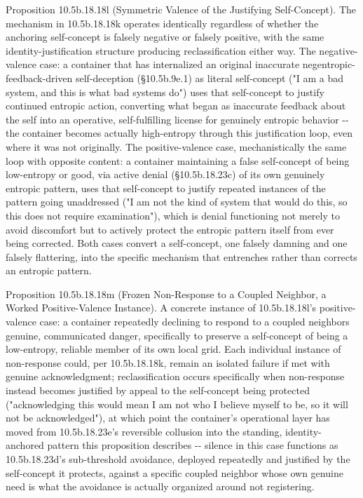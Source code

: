 \documentclass[
]{article}
\begin{document}
Proposition 10.5b.18.18l (Symmetric Valence of the Justifying
Self-Concept). The mechanism in 10.5b.18.18k operates identically
regardless of whether the anchoring self-concept is falsely negative or
falsely positive, with the same identity-justification structure
producing reclassification either way. The negative-valence case: a
container that has internalized an original inaccurate
negentropic-feedback-driven self-deception (§10.5b.9e.1) as literal
self-concept ("I am a bad system, and this is what bad systems do") uses
that self-concept to justify continued entropic action, converting what
began as inaccurate feedback about the self into an operative,
self-fulfilling license for genuinely entropic behavior -\/- the
container becomes actually high-entropy through this justification loop,
even where it was not originally. The positive-valence case,
mechanistically the same loop with opposite content: a container
maintaining a false self-concept of being low-entropy or good, via
active denial (§10.5b.18.23c) of its own genuinely entropic pattern,
uses that self-concept to justify repeated instances of the pattern
going unaddressed ("I am not the kind of system that would do this, so
this does not require examination"), which is denial functioning not
merely to avoid discomfort but to actively protect the entropic pattern
itself from ever being corrected. Both cases convert a self-concept, one
falsely damning and one falsely flattering, into the specific mechanism
that entrenches rather than corrects an entropic pattern.

Proposition 10.5b.18.18m (Frozen Non-Response to a Coupled Neighbor, a
Worked Positive-Valence Instance). A concrete instance of 10.5b.18.18l's
positive-valence case: a container repeatedly declining to respond to a
coupled neighbors genuine, communicated danger, specifically to preserve
a self-concept of being a low-entropy, reliable member of its own local
grid. Each individual instance of non-response could, per 10.5b.18.18k,
remain an isolated failure if met with genuine acknowledgment;
reclassification occurs specifically when non-response instead becomes
justified by appeal to the self-concept being protected ("acknowledging
this would mean I am not who I believe myself to be, so it will not be
acknowledged"), at which point the container's operational layer has
moved from 10.5b.18.23e's reversible collusion into the standing,
identity-anchored pattern this proposition describes -\/- silence in
this case functions as 10.5b.18.23d's sub-threshold avoidance, deployed
repeatedly and justified by the self-concept it protects, against a
specific coupled neighbor whose own genuine need is what the avoidance
is actually organized around not registering.
\end{document}

